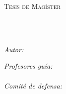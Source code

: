 \documentclass[
11pt, %
oneside, %
spanish, %
singlespacing, %
parskip, %
headsepline, %
table
]{MastersDoctoralThesis} %
\author{Fernando Andrés Zamora Carrasco} %
\begin{document}
\frontmatter %

\pagestyle{plain} %


\begin{titlepage}
\begin{center}

\vspace*{.06\textheight}
{\scshape\LARGE \univname\par}\vspace{1.5cm} %
\textsc{\Large Tesis de Magíster}\\[0.5cm] %

\HRule \\[0.4cm] %
{\LARGE \bfseries \ttitle\par}\vspace{0.4cm} %
\HRule \\[1.5cm] %
 
\begin{minipage}[t]{0.4\textwidth}
\begin{flushleft} \large
\emph{Autor:}\\
{\authorname} %
\end{flushleft}
\end{minipage}
\begin{minipage}[t]{0.4\textwidth}
\begin{flushright} \large
\emph{Profesores guía:} \\
\supname\\
\vspace{5mm}
\emph{Comité de defensa:} \\
\examname\\
\end{flushright}
\end{minipage}\\[2.5cm]
 

\end{center}
\end{titlepage}
\end{document}
